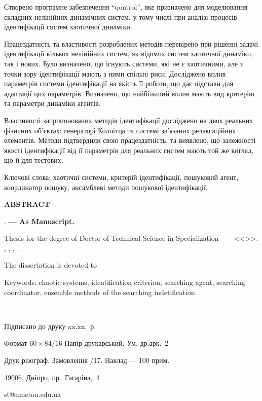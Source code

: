 \documentclass[a4paper,13pt]{atuaref}
\newcommand{\xsect}[1]{\medskip\begin{center}\textbf{#1}\end{center}\medskip\penalty10000}
\begin{document}
Створено програмне забезпечення ``qontrol'',
яке призначено для моделювання складних нелінійних динамічних
систем, у тому числі при аналізі процесів ідентифікації систем хаотичної динаміки.

Працездатність та властивості розроблених методів перевірено при
рішенні задачі ідентифікації кількох нелінійних систем,
як відомих систем хаотичної динаміки, так і нових.
Було визначено, що існують системи, які не є хаотичними, але
з точки зору ідентифікації мають з ними спільні риси.
Досліджено вплив параметрів системи ідентифікації на якість її роботи,
що дає підстави для адаптації цих параметрів. Визначено,
що найбільший вплив мають вид критерію та параметри динаміки агентів.

Властивості запропонованих методів ідентифікації досліджено
на двох реальних фізичних об'єктах:
генераторі Колпітца та системі зв'язаних релаксаційних елементів.
Методи підтвердили свою працездатність, та виявлено,
що залежності якості ідентифікації від її параметрів для реальних систем мають той же вигляд,
що й для тестових.



Ключові слова:
хаотичні системи,
критерій ідентифікації,
пошуковий агент,
координатор пошуку,
ансамблеві методи пошукової ідентифікації.

\xsect{ABSTRACT}

\textbf{\dissauthorEn}
\textbf{\booknameEn}.
\textbf{--- As Manuscript.}

Thesis for the degree of Doctor of Technical Science in Specialization
\dissSpecId\ --- <<\dissSpecEn>>.
\institutionEn, \belongEn, \cityEn, \bookyear.

The dissertation is devoted to

Keywords:
chaotic systems,
identification criterion,
searching agent,
searching coordinator,
ensemble methods of the searching indetification.

\clearpage

{~}
\vfill

\begin{center}


Підписано до друку xx.xx.\bookyear~р.

Формат $60 \times 84/16$  Папір друкарський. Ум. др.арк.~2

Друк різограф. Замовлення /17. Наклад --- 100 прим.


49006, Дніпро, пр.~Гагаріна,~4

st@nmetau.edu.ua

\end{center}

\vfill
\end{document}

